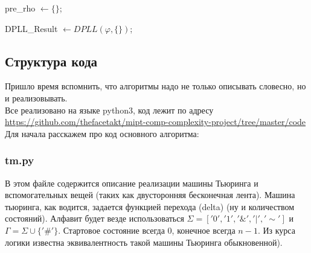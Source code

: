 \documentclass[paper=a4, fontsize=11pt]{scrartcl}
\begin{document}
\pagebreak

\begin{algorithm}[H]
	 {


		pre\_rho $\leftarrow \{\}$;

        DPLL\_Result  $ \leftarrow DPLL(\varphi, \{\})$;

	}
\end{algorithm}



\subsection{Структура кода}

Пришло время вспомнить, что алгоритмы надо не только описывать словесно, но
и реализовывать.\\

Все реализовано на языке python3,
код лежит по адресу \url{https://github.com/thefacetakt/mipt-comp-complexity-project/tree/master/code} \\

Для начала расскажем про код основного алгоритма:\\

\subsubsection{tm.py}

В этом файле содержится описание реализации машины Тьюринга и вспомогательных
вещей (таких как двусторонняя бесконечная лента). Машина тьюринга, как водится,
задается функцией перехода (delta) (ну и количеством состояний).
Алфавит будет везде использоваться $\Sigma = ['0', '1', '\&', '|', '\sim']$ и
$\Gamma = \Sigma \cup \{'\#'\}$. Стартовое состояние всегда 0, конечное всегда
$n - 1$. Из курса логики известна эквивалентность такой машины Тьюринга
обыкновенной). \\
\end{document}
